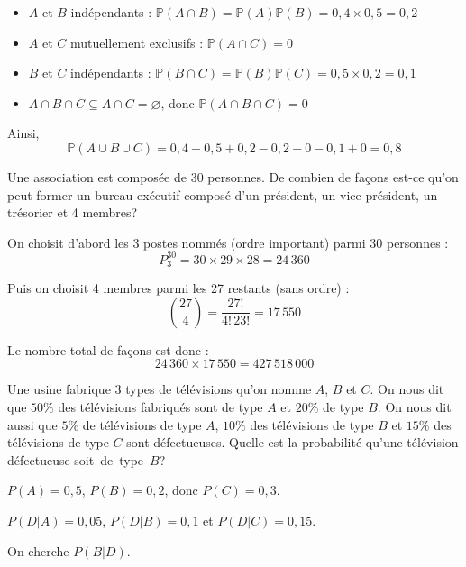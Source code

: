 \begin{questions}
\begin{solution}
\begin{itemize}
\item $A$ et $B$ indépendants : $\mathbb{P}(A \cap B) = \mathbb{P}(A)\mathbb{P}(B) = 0{,}4 \times 0{,}5 = 0{,}2$
\item $A$ et $C$ mutuellement exclusifs : $\mathbb{P}(A \cap C) = 0$
\item $B$ et $C$ indépendants : $\mathbb{P}(B \cap C) = \mathbb{P}(B)\mathbb{P}(C) = 0{,}5 \times 0{,}2 = 0{,}1$
\item $A \cap B \cap C \subseteq A \cap C = \varnothing$, donc $\mathbb{P}(A \cap B \cap C) = 0$
\end{itemize}

Ainsi,
$$\mathbb{P}(A \cup B \cup C) = 0{,}4 + 0{,}5 + 0{,}2 - 0{,}2 - 0 - 0{,}1 + 0 = 0{,}8$$
\end{solution}
\newpage

\question[5] Une association est composée de 30 personnes. De combien de façons est-ce qu'on peut former un bureau exécutif composé d'un président, un vice-président, un trésorier et 4 membres?

\begin{solution}
On choisit d'abord les 3 postes nommés (ordre important) parmi 30 personnes :
$$P^{30}_3 = 30 \times 29 \times 28 = 24\,360$$

Puis on choisit 4 membres parmi les 27 restants (sans ordre) :
$$\binom{27}{4} = \frac{27!}{4!\,23!} = 17\,550$$

Le nombre total de façons est donc :
$$24\,360 \times 17\,550 = 427\,518\,000$$
\end{solution}

\vspace{8cm}
\question[5] Une usine fabrique 3 types de télévisions qu'on nomme $A$, $B$ et $C$. On nous dit que $50\%$ des télévisions fabriqués sont de type $A$ et $20\%$ de type $B$. On nous dit aussi que $5\%$ de télévisions de type $A$, $10\%$ des télévisions de type $B$ et $15\%$ des télévisions de type $C$ sont défectueuses. Quelle est la probabilité qu'une télévision défectueuse soit~de~type~$B$?

\begin{solution}
$P(A)=0,5$, $P(B)=0,2$, donc $P(C)=0,3$.

$P(D|A)=0,05$, $P(D|B)=0,1$ et $P(D|C)=0,15$.

On cherche $P(B|D)$.


\end{solution}
\end{questions}
